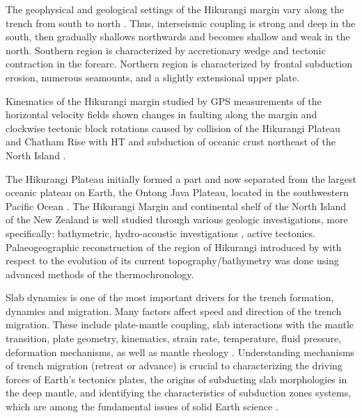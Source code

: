 \documentclass[11pt,a4paper]{report}
\begin{document}
{The geophysical and geological settings of the Hikurangi margin vary along the trench from south to north \cite{Wallaceetal2009}. Thus, interseismic coupling is strong and deep in the south, then gradually shallows northwards and becomes shallow and weak in the north. Southern region is characterized by accretionary wedge and tectonic contraction in the forearc. Northern region is characterized by frontal subduction erosion, numerous seamounts, and a slightly extensional upper plate. 

Kinematics of the Hikurangi margin studied by \ac{GPS} measurements of the horizontal velocity fields \cite{NicolWallace2007} shown changes in faulting along the margin and clockwise tectonic block rotations caused by collision of the Hikurangi Plateau and Chatham Rise with \ac{HT} and subduction of oceanic crust northeast of the North Island \cite{Lemenkova202031}. 

The Hikurangi Plateau initially formed a part and now separated from the largest oceanic plateau on Earth, the Ontong Java Plateau, located in the southwestern Pacific Ocean \cite{Neal1997}. The Hikurangi Margin and continental shelf of the North Island of the New Zealand is well studied through various geologic investigations, more specifically: bathymetric, hydro-acoustic investigations \cite{Barnesetal2010}, active tectonics. Palaeogeographic reconstruction of the region of Hikurangi introduced by \cite{Jiaoetal2015} with respect to the evolution of its current topography/bathymetry was done using advanced methods of the thermochronology. 

Slab dynamics is one of the most important drivers for the trench formation, dynamics and migration. Many factors affect speed and direction of the trench migration. These include plate-mantle coupling, slab interactions with the mantle transition, plate geometry, kinematics, strain rate, temperature, fluid pressure, deformation mechanisms, as well as mantle rheology \cite{Faccennaetal2018}. Understanding mechanisms of trench migration (retreat or advance) is crucial to characterizing the driving forces of Earth’s tectonics plates, the origins of subducting slab morphologies in the deep mantle, and identifying the characteristics of subduction zones systems, which are among the fundamental issues of solid Earth science \cite{Yoshida2017}. 

}
\end{document}
